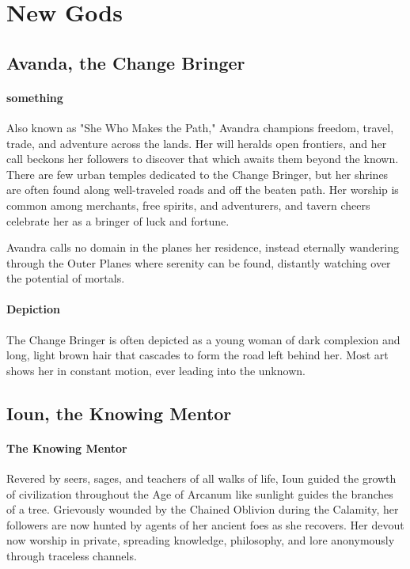 \documentclass[letterpaper,twocolumn,openany,nodeprecatedcode]{dndbook}
\begin{document}
\section{New Gods}

\subsection{Avanda, the Change Bringer}

\paragraph{something}
Also known as "She Who Makes the Path," Avandra champions freedom, travel, trade, and
adventure across the lands. Her will heralds open frontiers, and her call beckons her
followers to discover that which awaits them beyond the known. There are few urban temples
dedicated to the Change Bringer, but her shrines are often found along well-traveled roads
and off the beaten path. Her worship is common among merchants, free spirits, and adventurers,
and tavern cheers celebrate her as a bringer of luck and fortune.

Avandra calls no domain in the planes her residence, instead eternally wandering through the
Outer Planes where serenity can be found, distantly watching over the potential of mortals.

\paragraph{Depiction}
The Change Bringer is often depicted as a young woman of dark complexion and long, light brown
hair that cascades to form the road left behind her. Most art shows her in constant motion,
ever leading into the unknown.

\subsection{Ioun, the Knowing Mentor}

\paragraph{The Knowing Mentor}
Revered by seers, sages, and teachers of all walks of life, Ioun guided the growth of
civilization throughout the Age of Arcanum like sunlight guides the branches of a tree.
Grievously wounded by the Chained Oblivion during the Calamity, her followers are now
hunted by agents of her ancient foes as she recovers. Her devout now worship in private,
spreading knowledge, philosophy, and lore anonymously through traceless channels.
\end{document}
